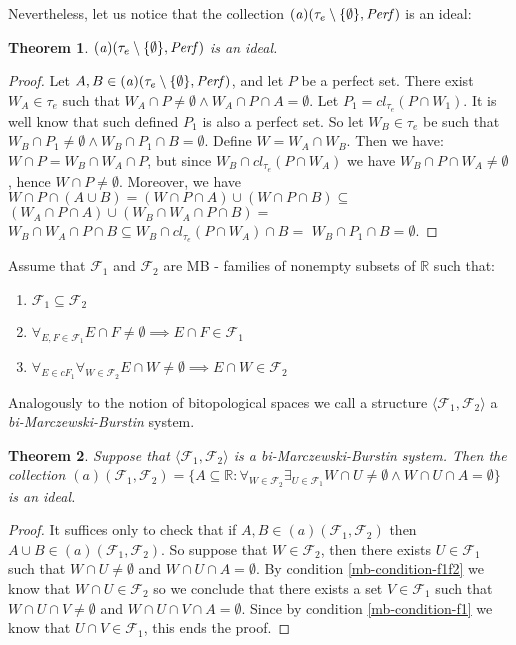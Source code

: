 \documentclass[12pt]{amsart}
\theoremstyle{plain}
\newtheorem{theorem}{Theorem}[section]
\theoremstyle{definition}
\theoremstyle{remark}
\newcommand{\cl}{\mathit{cl}}
\newcommand{\Perf}{{\it Perf}}
\newcommand{\real}{\mathbb{R}}
\newcommand{\cF}{{\mathcal F}}
\newcommand{\aideal}{\mathit{(a)}}
\newcommand{\biMB}{bi-Marczewski-Burstin}
\begin{document}
Nevertheless, let us notice that the collection
$\aideal(\tau_e\setminus\lbrace\emptyset\rbrace, \Perf)$ is an ideal:
\begin{theorem}
$\aideal(\tau_e\setminus\lbrace\emptyset\rbrace, \Perf)$ is an ideal.
\end{theorem}
\begin{proof}
Let $A, B \in \aideal(\tau_e\setminus\lbrace\emptyset\rbrace, \Perf)$,
and let $P$ be a perfect set. 
There exist $W_A \in \tau_e$ such that 
$W_A \cap P \not= \emptyset \wedge W_A \cap P \cap A = \emptyset$.
Let $P_1 = \cl_{\tau_e}(P \cap W_1)$. It is well know that such defined
$P_1$ is also a perfect set. So let $W_B \in \tau_e$ 
be such that 
$W_B \cap P_1 \not= \emptyset \wedge W_B \cap P_1 \cap B = \emptyset$.
Define $W = W_A \cap W_B$. Then we have:
$W \cap P = W_B \cap W_A \cap P$, 
but since $W_B \cap \cl_{\tau_e}(P \cap W_A)$
we have $W_B \cap P \cap W_A \not= \emptyset$,
hence $W \cap P \not= \emptyset$.
Moreover, we have
$W \cap P \cap (A \cup B) = (W \cap P \cap A) \cup (W \cap P \cap B) \subseteq$
$(W_A \cap P \cap A) \cup (W_B \cap W_A \cap P \cap B) =$
$W_B \cap W_A \cap P \cap B \subseteq W_B \cap \cl_{\tau_e} (P \cap W_A) \cap B =$
$W_B \cap P_1 \cap B = \emptyset$.
\end{proof}

Assume that $\cF_1$ and $\cF_2$ are MB - families of nonempty 
subsets of $\real$ such that:
\begin{enumerate}	
\item
\label{mb-condition-subset}
  $\cF_1 \subseteq \cF_2$
\item 
\label{mb-condition-f1}
  $\forall_{E,F \in \cF_1} E \cap F \not= \emptyset \implies E \cap F \in \cF_1$
\item
\label{mb-condition-f1f2}
  $\forall_{E \in cF_1} \forall_{W \in \cF_2} E \cap W \not= \emptyset \implies E \cap W \in \cF_2$  
\end{enumerate}	

Analogously to the notion of bitopological spaces we call a structure
$\langle \cF_1, \cF_2 \rangle$ a {\it\biMB{}} system.

\begin{theorem}
Suppose that $\langle \cF_1, \cF_2 \rangle$ is a \biMB{} system.
Then the collection
$\aideal(\cF_1, \cF_2) = \lbrace A \subseteq \real\colon 
\forall_{W\in \cF_2} \exists_{U \in \cF_1}
W \cap U \not= \emptyset \wedge W \cap U \cap A = \emptyset
\rbrace$ 
is an ideal. 
\end{theorem}
\begin{proof}
It suffices only to check that if $A, B \in \aideal(\cF_1, \cF_2)$ then
$A\cup B \in \aideal(\cF_1, \cF_2)$.
So suppose that $W \in \cF_2$, then there exists $U\in\cF_1$
such that 
$W \cap U \not= \emptyset$ and $W \cap U \cap A = \emptyset$.
By condition \ref{mb-condition-f1f2} 
we know that $W \cap U \in \cF_2$ so
we conclude that
there exists a set $V \in \cF_1$ such that
$W \cap U \cap V \not= \emptyset$ and $W \cap U \cap V \cap A = \emptyset$.
Since by condition \ref{mb-condition-f1} we know that 
$U \cap V \in \cF_1$, this ends the proof.
\end{proof}
\end{document}
